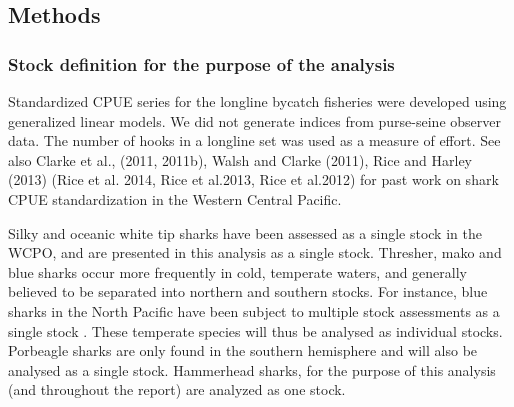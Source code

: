  \subsection{Methods}
 \label{cpuemeth:datafilter}
 \subsubsection{Stock definition for the purpose of the analysis}
   
Standardized CPUE series for the longline bycatch fisheries were developed using generalized linear models. We did not generate indices from purse-seine observer data. The number of hooks in a longline set was used as a measure of effort.
See also Clarke et al., (2011, 2011b),  Walsh and Clarke (2011), Rice and Harley (2013) (Rice et al. 2014, Rice et al.2013, Rice et al.2012)  for past work on shark CPUE standardization in the Western Central Pacific.
                                                                                       
Silky and oceanic white tip sharks have been assessed \citep{Rice2012_a, Rice2013_a} as a single stock in the WCPO, and are presented in this analysis as a single stock.  Thresher, mako and blue sharks occur more frequently in cold, temperate waters, and generally believed to be separated into northern and southern stocks. For instance, blue sharks in the North Pacific have been subject to multiple stock assessments as a single stock \citep{XXXX}. These temperate species will thus be analysed as individual stocks. Porbeagle sharks are only found in the southern hemisphere and will also be analysed as a single stock. Hammerhead sharks, for the purpose of this analysis (and throughout the report) are analyzed as one stock.

